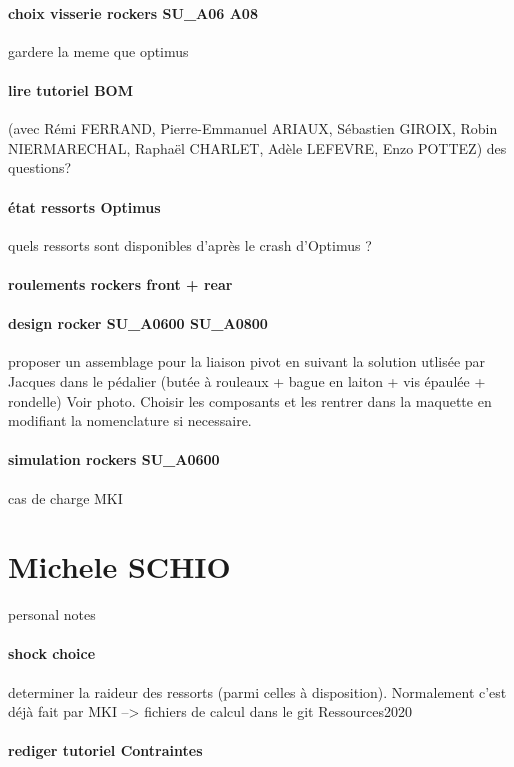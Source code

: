 \paragraph{choix visserie rockers SU\_A06 A08} gardere la meme que optimus

\paragraph{lire tutoriel BOM} (avec Rémi FERRAND, Pierre-Emmanuel ARIAUX, Sébastien GIROIX, Robin NIERMARECHAL, Raphaël CHARLET, Adèle LEFEVRE, Enzo POTTEZ) des questions?
\paragraph{état ressorts Optimus} quels ressorts sont disponibles d'après le crash d'Optimus ?
\paragraph{roulements rockers front + rear} 
\paragraph{design rocker SU\_A0600 SU\_A0800} proposer un assemblage pour la liaison pivot en suivant la solution utlisée par Jacques dans le pédalier (butée à rouleaux + bague en laiton + vis épaulée + rondelle) Voir photo. Choisir les composants et les rentrer dans la maquette en modifiant la nomenclature si necessaire.
\paragraph{simulation rockers SU\_A0600} cas de charge MKI

 
 \newpage \section*{Michele SCHIO} 
 \par personal notes
\paragraph{shock choice} determiner la raideur des ressorts (parmi celles à disposition). Normalement c'est déjà fait par MKI --> fichiers de calcul dans le git Ressources2020 
\paragraph{rediger tutoriel Contraintes} 
